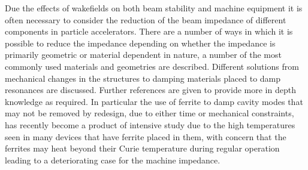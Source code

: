 Due the effects of wakefields on both beam stability and machine equipment it is often necessary to consider the reduction of the beam impedance of different components in particle accelerators. There are a number of ways in which it is possible to reduce the impedance depending on whether the impedance is primarily geometric or material dependent in nature, a number of the most commonly used materials and geometries are described. Different solutions from mechanical changes in the structures to damping materials placed to damp resonances are discussed. Further references are given to provide more in depth knowledge as required. In particular the use of ferrite to damp cavity modes that may not be removed by redesign, due to either time or mechanical constraints, has recently become a product of intensive study due to the high temperatures seen in many devices that have ferrite placed in them, with concern that the ferrites may heat beyond their Curie temperature during regular operation leading to a deteriorating case for the machine impedance. 